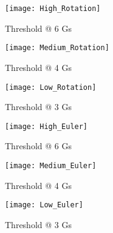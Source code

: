 \begin{figure}[hbt!]
	\centering
	\texttt{[image: High\_Rotation]}
	\caption{Threshold @ 6 Gs}
	\label{fig:high_rot}
\end{figure}
\begin{figure}[hbt!]
	\centering
	\texttt{[image: Medium\_Rotation]}
	\caption{Threshold @ 4 Gs}
	\label{fig:medium_rot}
\end{figure}
\begin{figure}[hbt!]
	\centering
	\texttt{[image: Low\_Rotation]}
	\caption{Threshold @ 3 Gs}
	\label{fig:low_rot}
\end{figure}


\begin{figure}[hbt!]
	\centering
	\texttt{[image: High\_Euler]}
	\caption{Threshold @ 6 Gs}
	\label{fig:high_euler}
\end{figure}
\begin{figure}[hbt!]
	\centering
	\texttt{[image: Medium\_Euler]}
	\caption{Threshold @ 4 Gs}
	\label{fig:medium_euler}
\end{figure}
\begin{figure}[hbt!]
	\centering
	\texttt{[image: Low\_Euler]}
	\caption{Threshold @ 3 Gs}
	\label{fig:low_euler}
\end{figure}


